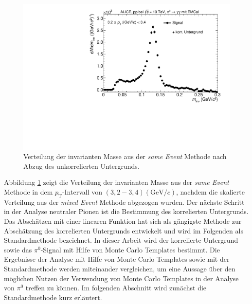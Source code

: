 \begin{figure}[tp]
\centering
\includegraphics[width=.75\linewidth]{hInvMass_Data.pdf}
\caption{Verteilung der invarianten Masse aus der \textit{same Event} Methode nach Abzug des unkorrelierten Untergrunds.}
\label{figInvMass_Data}
\end{figure}
\newline
Abbildung \ref{figInvMass_Data} zeigt die Verteilung der invarianten Masse aus der \textit{same Event} Methode in dem $p_\text{T}$-Intervall von $(3,2 - 3,4) (\text{GeV/}c)$, nachdem die skalierte Verteilung aus der \textit{mixed Event} Methode abgezogen wurden.
\newline
Der nächste Schritt in der Analyse neutraler Pionen ist die Bestimmung des korrelierten Untergrunds.
Das Abschätzen mit einer linearen Funktion hat sich als gängigste Methode zur Abschätzung des korrelierten Untergrunds entwickelt und wird im Folgenden als Standardmethode bezeichnet.
In dieser Arbeit wird der korrelierte Untergrund sowie das $\pi^{0}$-Signal mit Hilfe von Monte Carlo Templates bestimmt.
Die Ergebnisse der Analyse mit Hilfe von Monte Carlo Templates sowie mit der Standardmethode werden miteinander vergleichen, um eine Aussage über den möglichen Nutzen der Verwendung von Monte Carlo Templates in der Analyse von $\pi^{0}$ treffen zu können.
Im folgenden Abschnitt wird zunächst die Standardmethode kurz erläutert.
